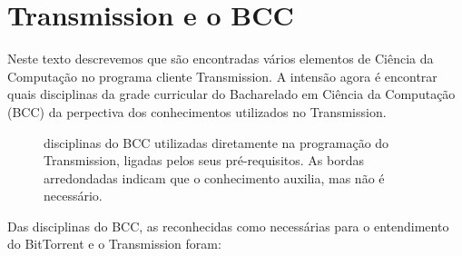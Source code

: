 
\chapter{Transmission e o BCC}

Neste texto descrevemos que são encontradas vários elementos de Ciência da Computação no
programa cliente Transmission. A intensão agora é encontrar quais disciplinas da grade
curricular do Bacharelado em Ciência da Computação (BCC) da perpectiva dos conhecimentos
utilizados no Transmission.

\begin{figure}[H]
    \centering
    \caption{disciplinas do BCC utilizadas diretamente na programação do Transmission, ligadas pelos seus pré-requisitos. As bordas arredondadas indicam que o conhecimento auxilia, mas não é necessário.}
    \label{fig:bcc}
\end{figure}

Das disciplinas do BCC, as reconhecidas como necessárias para o entendimento do
BitTorrent e o Transmission foram:

